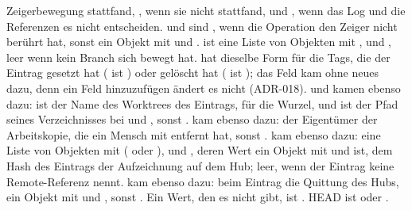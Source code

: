 Zeigerbewegung stattfand, , wenn sie nicht stattfand, und , wenn das Log und
die Referenzen es nicht entscheiden.  und  sind , wenn die
Operation den Zeiger nicht berührt hat, sonst ein Objekt mit  und .
 ist eine Liste von Objekten mit ,  und , leer wenn
kein Branch sich bewegt hat.  hat dieselbe Form für die Tags, die der Eintrag
gesetzt hat ( ist ) oder gelöscht hat ( ist ); das Feld
kam ohne neues  dazu, denn ein Feld
hinzuzufügen ändert es nicht (ADR-018).  und  kamen ebenso dazu:
 ist der Name des Worktrees des Eintrags,  für die Wurzel, und
 ist der Pfad seines Verzeichnisses bei  und
, sonst .  kam ebenso dazu: der Eigentümer
der Arbeitskopie, die ein Mensch mit  entfernt hat, sonst
.  kam ebenso dazu: eine Liste von Objekten mit 
( oder ),
 und , deren Wert ein Objekt mit  und  ist, dem
Hash des Eintrags der Aufzeichnung auf dem Hub; leer, wenn der Eintrag keine Remote-Referenz
nennt.  kam ebenso dazu: beim Eintrag  die Quittung des Hubs, ein Objekt
mit  und , sonst . Ein Wert, den es nicht gibt, ist
.
HEAD ist  oder .


